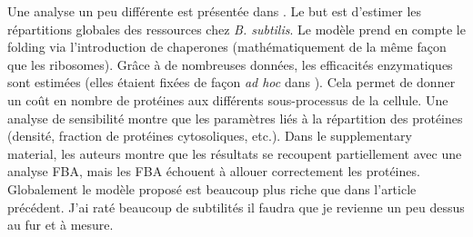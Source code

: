 Une analyse un peu différente est présentée dans \citet{goelzer_quantitative_2015}. Le but est d'estimer les répartitions globales des ressources chez \textit{B. subtilis}. Le modèle prend en compte le folding via l'introduction de chaperones (mathématiquement de la même façon que les ribosomes). Grâce à de nombreuses données, les efficacités enzymatiques sont estimées (elles étaient fixées de façon \textit{ad hoc} dans \citet{goelzer_cell_2011}). Cela permet de donner un coût en nombre de protéines aux différents sous-processus de la cellule. Une analyse de sensibilité montre que les paramètres liés à la répartition des protéines (densité, fraction de protéines cytosoliques, etc.). Dans le supplementary material, les auteurs montre que les résultats se recoupent partiellement avec une analyse FBA, mais les FBA échouent à allouer correctement les protéines. Globalement le modèle proposé est beaucoup plus riche que dans l'article précédent. J'ai raté beaucoup de subtilités il faudra que je revienne un peu dessus au fur et à mesure.
